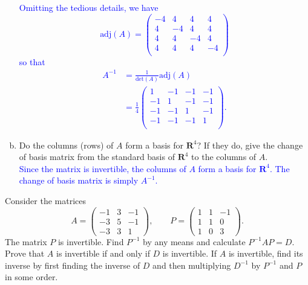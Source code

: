 \documentclass[a4paper,11pt]{article}
\newcommand{\R}{\mathbf{R}}
\newcommand{\BB}[1]{\textcolor{blue}{#1}}
\begin{document}
\begin{enumerate}[(a)]
  \BB{Omitting the tedious details, we have
    \[
      \text{adj}(A) =
      \left(
        \begin{array}{rrrr}
          -4 & 4 & 4 & 4 \\
          4 & -4 & 4 & 4 \\
          4 & 4 & -4 & 4 \\
          4 & 4 & 4 & -4 \\
        \end{array}
      \right)
    \]
    so that
    \begin{align*}
      A^{-1} &= \frac{1}{\text{det}(A)}\text{adj}(A) \\
      &= \frac{1}{4}
        \left(
        \begin{array}{rrrr}
          1 & -1 & -1 & -1 \\
          -1 & 1 & -1 & -1 \\
          -1 & -1 & 1 & -1 \\
          -1 & -1 & -1 & 1 \\
        \end{array}
      \right).
    \end{align*}
  }
  
\item Do the columns (rows) of $A$ form a basis for $\R^4$? If they do, give
  the change of basis matrix from the standard basis of $\R^4$ to the columns of
  $A$. \\

  \BB{Since the matrix is invertible, the columns of $A$ form a basis for
    $\R^4$. The change of basis matrix is simply $A^{-1}$. \\}
\end{enumerate}

 Consider the matrices
\[
  A =
  \left(
    \begin{array}{rrr}
      -1 & 3 & -1 \\
      -3 & 5 & -1 \\
      -3 & 3 & 1
    \end{array}
  \right), \qquad
  P = 
  \left(
    \begin{array}{rrr}
      1 & 1 & -1 \\
      1 & 1 & 0 \\
      1 & 0 & 3
    \end{array}
  \right).
\]
The matrix $P$ is invertible. Find $P^{-1}$ by any means and calculate
$P^{-1}AP=D$. Prove that $A$ is invertible if and only if $D$ is invertible. If
$A$ is invertible, find its inverse by first finding the inverse of $D$ and then
multiplying $D^{-1}$ by $P^{-1}$ and $P$ in some order. \\ 
\end{document}
